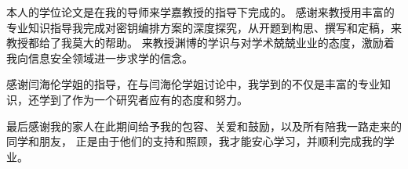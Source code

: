\begin{thanks}

本人的学位论文是在我的导师来学嘉教授的指导下完成的。
感谢来教授用丰富的专业知识指导我完成对密钥编排方案的深度探究，从开题到构思、撰写和定稿，来教授都给了我莫大的帮助。
来教授渊博的学识与对学术兢兢业业的态度，激励着我向信息安全领域进一步求学的信念。

感谢闫海伦学姐的指导，在与闫海伦学姐讨论中，我学到的不仅是丰富的专业知识，还学到了作为一个研究者应有的态度和努力。

最后感谢我的家人在此期间给予我的包容、关爱和鼓励，以及所有陪我一路走来的同学和朋友，
正是由于他们的支持和照顾，我才能安心学习，并顺利完成我的学业。

\end{thanks}
